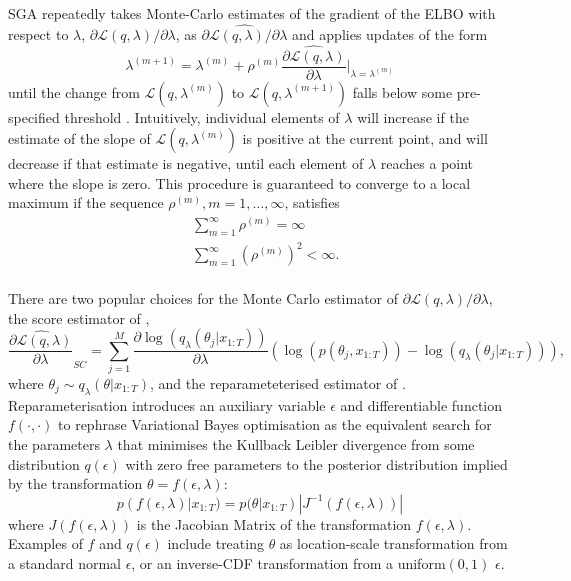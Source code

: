 \documentclass[12pt,a4paper]{article}\usepackage[]{graphicx}\usepackage[]{color}
\begin{document}
SGA repeatedly takes Monte-Carlo estimates of the gradient of the ELBO with respect to $\lambda$, $\partial\mathcal{L}(q, \lambda) / \partial \lambda$, as $\widehat{\partial\mathcal{L}(q, \lambda) / \partial \lambda}$ and applies updates of the form
\begin{equation}
\label{gradientAscent}
\lambda^{(m+1)} = \lambda^{(m)} + \rho^{(m)} \widehat{\frac{\partial\mathcal{L}(q, \lambda)}{\partial \lambda}} \bigg\rvert_{\lambda = \lambda^{(m)}}
\end{equation}
until the change from $\mathcal{L}(q, \lambda^{(m)})$ to $\mathcal{L}(q, \lambda^{(m+1)})$ falls below some pre-specified threshold \citep{Hoffman2013}. Intuitively, individual elements of $\lambda$ will increase if the estimate of the slope of $\mathcal{L}(q, \lambda^{(m)})$ is positive at the current point, and will decrease if that estimate is negative, until each element of $\lambda$ reaches a point where the slope is zero. This procedure is guaranteed to converge to a local maximum \citep{Robbins1951} if the sequence $\rho^{(m)}, m = 1, \dots, \infty$, satisfies
\begin{align}
&\sum_{m=1}^{\infty} \rho^{(m)} =  \infty \\
&\sum_{m=1}^{\infty} (\rho^{(m)})^2 <  \infty.
\end{align}
\\

There are two popular choices for the Monte Carlo estimator of $\partial\mathcal{L}(q, \lambda) / \partial \lambda$, the score estimator of \citet{Ranganath2014}, 
\begin{equation}
\label{scoreDeriv}
\widehat{\frac{\partial\mathcal{L}(q, \lambda)}{\partial \lambda}}_{SC} = \sum_{j = 1}^M \frac{\partial \log(q_{\lambda}(\theta_{j} | x_{1:T}))}{\partial \lambda} \left(\log(p(\theta_{j}, x_{1:T})) - \log(q_{\lambda}(\theta_{j} | x_{1:T})) \right),
\end{equation}
where $\theta_{j} \sim q_{\lambda}(\theta | x_{1:T})$, and the reparameteterised estimator of \citet{Kingma2014}. Reparameterisation introduces an auxiliary variable $\epsilon$ and differentiable function $f(\cdot, \cdot)$ to rephrase Variational Bayes optimisation as the equivalent search for the parameters $\lambda$ that minimises the Kullback Leibler divergence from some distribution $q(\epsilon)$ with zero free parameters to the posterior distribution implied by the transformation $\theta = f(\epsilon, \lambda)$:
\begin{equation}
\label{rpDist}
p(f(\epsilon, \lambda) | x_{1:T}) = p(\theta | x_{1:T}) |J^{-1}(f(\epsilon, \lambda))|
\end{equation}
where $J(f(\epsilon, \lambda))$ is the Jacobian Matrix of the transformation $f(\epsilon, \lambda)$. Examples of $f$ and $q(\epsilon)$ include treating $\theta$ as location-scale transformation from a standard normal $\epsilon$, or an inverse-CDF transformation from a uniform$(0, 1)$ $\epsilon$. 
\\
\end{document}
